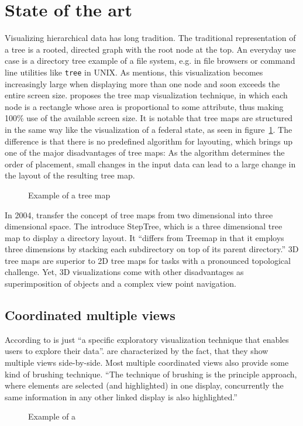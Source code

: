 \documentclass{article}
\begin{document}
\section{State of the art}
Visualizing hierarchical data has long tradition.
The traditional representation of a tree is a rooted, directed graph with the root node at the top.
An everyday use case is a directory tree example of a file system, e.g. in file browsers or command line utilities like \texttt{tree} in UNIX.
As \textcite{Shneiderman1992} mentions, this visualization becomes increasingly large when displaying more than one node and soon exceeds the entire screen size.
\textcite{Johnson1991} proposes the tree map visualization technique, in which each node is a rectangle whose area is proportional to some attribute, thus making 100\% use of the available screen size.
It is notable that tree maps are structured in the same way like the visualization of a federal state, as seen in figure~\ref{fig:research:treemap}.
The difference is that there is no predefined algorithm for layouting, which brings up one of the major disadvantages of tree maps:
As the algorithm determines the order of placement, small changes in the input data can lead to a large change in the layout of the resulting tree map.

\begin{figure}[h]
\centering
\caption{Example of a tree map}
\label{fig:research:treemap}
\end{figure}

In 2004, \textcite{Bladh2004} transfer the concept of tree maps from two dimensional into three dimensional space.
The introduce StepTree, which is a three dimensional tree map to display a directory layout.
It ``differs from Treemap in that it employs three dimensions by stacking each subdirectory on top of its parent directory.''\cite{Bladh2004}
3D tree maps are superior to 2D tree maps for tasks with a pronounced topological challenge.
Yet, 3D visualizations come with other disadvantages as superimposition of objects and a complex view point navigation.


\subsection{Coordinated multiple views}
According to \textcite{cmv:state_of_the_art} \cmvs{} is just ``a specific exploratory visualization technique that enables users to explore their data''.
\cmvs{} are characterized by the fact, that they show multiple views side-by-side.
Most multiple coordinated views also provide some kind of brushing technique.
``The technique of brushing is the principle approach, where elements are selected (and highlighted) in one display, concurrently the same information in any other linked display is also highlighted.''\cite{cmv:state_of_the_art}

\begin{figure}[h]
\centering
\caption{Example of a \cmvs{}}
\label{fig:research:cmv}
\end{figure}







\clearpage
\printbibliography
\end{document}
